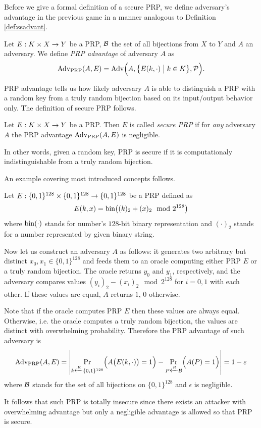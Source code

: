 Before we give a formal definition of a secure PRP, we define adversary's advantage in the previous game in a manner analogous to Definition \ref{def:ssadvant}.

\begin{defn}
\label{def:prpadvant}
	Let $E: K\times X\rightarrow Y$ be a PRP, $\cal B$ the set of all bijections from $X$ to $Y$ and $A$ an adversary. We define {\em PRP advantage} of adversary $A$ as
	\[
		\operatorname*{Adv_{PRP}}(A,E) = \operatorname*{Adv}\Bigl(A,\bigl\{E(k,\cdot)\bigm|k\in K\bigr\},{\cal P}\Bigr) .
	\]
\end{defn}

PRP advantage tells us how likely adversary $A$ is able to distinguish a PRP with a random key from a truly random bijection based on its input/output behavior only. The definition of secure PRP follows.

\begin{defn}
\label{def:secprp}
	Let $E: K\times X\rightarrow Y$ be a PRP. Then $E$ is called {\em secure PRP} if for {\em any} adversary $A$ the PRP advantage $\operatorname*{Adv_{PRP}}(A,E)$ is negligible.
\end{defn}

In other words, given a random key, PRP is secure if it is computationaly indistinguishable from a truly random bijection. 


An example covering most introduced concepts follows.

\begin{example}
	Let $E:\{0,1\}^{128}\times\{0,1\}^{128}\rightarrow\{0,1\}^{128}$ be a PRP defined as
	\[
		E(k,x) = \operatorname*{bin}\bigl((k)_2 + (x)_2 \mod{2^{128}}\bigr)
	\]
	where $\operatorname*{bin}(\cdot)$ stands for number's $128$-bit binary representation and $(\cdot)_2$ stands for a number represented by given binary string.
	
	Now let us construct an adversary $A$ as follows: it generates two arbitrary but distinct $x_0,x_1\in\{0,1\}^{128}$ and feeds them to an oracle computing either PRP $E$ or a truly random bijection. The oracle returns $y_0$ and $y_1$, respectively, and the adversary compares values $(y_i)_2 - (x_i)_2 \mod{2^{128}}$ for $i=0,1$ with each other. If these values are equal, $A$ returns $1$, $0$ otherwise.
	
	Note that if the oracle computes PRP $E$ then these values are always equal. Otherwise, i.e. the oracle computes a truly random bijection, the values are distinct with overwhelming probability. Therefore the PRP advantage of such adversary is
	\[
		\operatorname*{Adv_{PRP}}(A,E) = \left| \Pr\limits_{k\xleftarrow{R} \{0,1\}^{128}}\Bigl(A\bigl(E(k,\cdot)\bigr)=1\Bigr) - \Pr\limits_{P\xleftarrow{R} {\cal B}}\Bigl(A(P)=1\Bigr) \right| = 1 - \varepsilon
	\]
	where $\cal B$ stands for the set of all bijections on $\{0,1\}^{128}$ and $\epsilon$ is negligible.
	
	It follows that such PRP is totally insecure since there exists an attacker with overwhelming advantage but only a negligible advantage is allowed so that PRP is secure.
\end{example}


